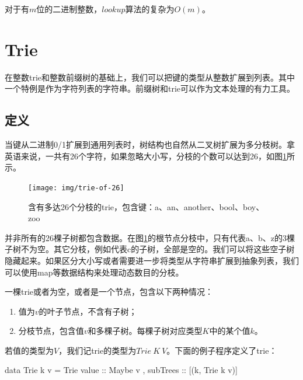 \documentclass[b5paper]{ctexart}
\begin{document}
对于有$m$位的二进制整数，$lookup$算法的复杂为$O(m)$。

\begin{Exercise}
\end{Exercise}

\section{Trie}

在整数trie和整数前缀树的基础上，我们可以把键的类型从整数扩展到列表。其中一个特例是作为字符列表的字符串。前缀树和trie可以作为文本处理的有力工具。

\subsection{定义}
当键从二进制0/1扩展到通用列表时，树结构也自然从二叉树扩展为多分枝树。拿英语来说，一共有26个字符，如果忽略大小写，分枝的个数可以达到26，如图\ref{fig:trie-of-26}所示。

\begin{figure}[htbp]
  \centering
  \texttt{[image: img/trie-of-26]}
  \caption{含有多达26个分枝的trie，包含键：a、an、another、bool、boy、zoo}
  \label{fig:trie-of-26}
\end{figure}

并非所有的26棵子树都包含数据。在图\ref{fig:trie-of-26}的根节点分枝中，只有代表a、b、z的3棵子树不为空。其它分枝，例如代表c的子树，全部是空的。我们可以将这些空子树隐藏起来。如果区分大小写或者需要进一步将类型从字符串扩展到抽象列表，我们可以使用map等数据结构来处理动态数目的分枝。

一棵trie或者为空，或者是一个节点，包含以下两种情况：

\begin{enumerate}
\item 值为$v$的叶子节点，不含有子树；
\item 分枝节点，包含值$v$和多棵子树。每棵子树对应类型$K$中的某个值$k$。
\end{enumerate}

若值的类型为$V$，我们记trie的类型为$Trie\ K\ V$。下面的例子程序定义了trie：

\begin{Haskell}
data Trie k v = Trie { value :: Maybe v
                     , subTrees :: [(k, Trie k v)]}
\end{Haskell}
\end{document}
